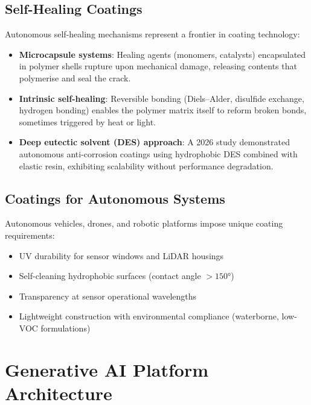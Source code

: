\documentclass[11pt,a4paper]{article}
\begin{document}
\subsection{Self-Healing Coatings}

Autonomous self-healing mechanisms represent a frontier in coating
technology:

\begin{itemize}[leftmargin=2em]
  \item \textbf{Microcapsule systems}: Healing agents (monomers, catalysts)
    encapsulated in polymer shells rupture upon mechanical damage, releasing
    contents that polymerise and seal the crack.
  \item \textbf{Intrinsic self-healing}: Reversible bonding (Diels--Alder,
    disulfide exchange, hydrogen bonding) enables the polymer matrix itself
    to reform broken bonds, sometimes triggered by heat or light.
  \item \textbf{Deep eutectic solvent (DES) approach}: A 2026 study
    demonstrated autonomous anti-corrosion coatings using hydrophobic DES
    combined with elastic resin, exhibiting scalability without performance
    degradation.
\end{itemize}

\subsection{Coatings for Autonomous Systems}

Autonomous vehicles, drones, and robotic platforms impose unique coating
requirements:
\begin{itemize}[leftmargin=2em]
  \item UV durability for sensor windows and LiDAR housings
  \item Self-cleaning hydrophobic surfaces (contact angle $>150°$)
  \item Transparency at sensor operational wavelengths
  \item Lightweight construction with environmental compliance (waterborne,
    low-VOC formulations)
\end{itemize}

\section{Generative AI Platform Architecture}
\end{document}
